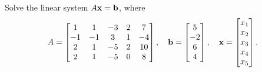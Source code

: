 \question Solve the linear system $A\bm{\mathrm{x}} = \bm{\mathrm{b}}$, where
\[
    A = \begin{bmatrix}
        1 & 1 & -3 & 2 & 7 \\
        -1 & -1 & 3 & 1 & -4 \\
        2 & 1 & -5 & 2 & 10 \\
        2 & 1 & -5 & 0 & 8
    \end{bmatrix},
    \quad
    \bm{\mathrm{b}} = \begin{bmatrix}
        5 \\ -2 \\ 6 \\ 4
    \end{bmatrix},
    \quad
    \bm{\mathrm{x}} = \begin{bmatrix}
        x_1 \\ x_2 \\ x_3 \\ x_4 \\ x_5
    \end{bmatrix}.
\]

